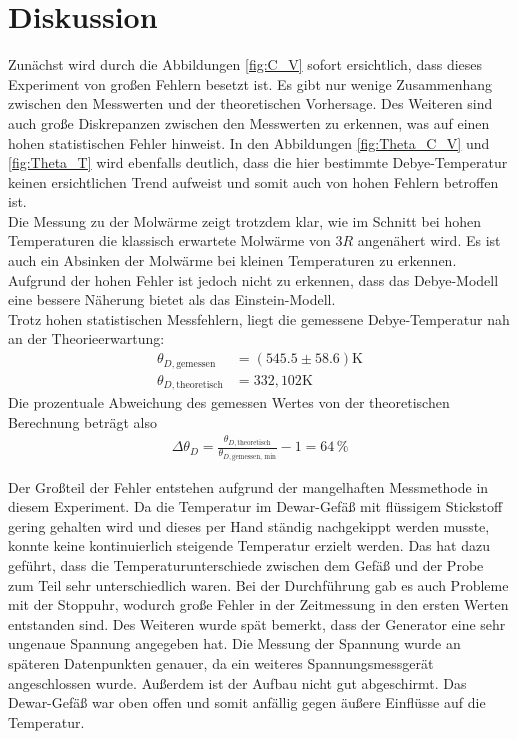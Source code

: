 \section{Diskussion}
\label{sec:Diskussion}
Zunächst wird durch die Abbildungen \ref{fig:C_V} sofort ersichtlich, dass dieses Experiment von großen Fehlern besetzt ist. 
Es gibt nur wenige Zusammenhang zwischen den Messwerten und der theoretischen Vorhersage. Des Weiteren sind 
auch große Diskrepanzen zwischen den Messwerten zu erkennen, was auf einen hohen statistischen Fehler hinweist. In den Abbildungen 
\ref{fig:Theta_C_V} und \ref{fig:Theta_T} wird ebenfalls deutlich, dass die hier bestimmte Debye-Temperatur keinen ersichtlichen Trend aufweist 
und somit auch von hohen Fehlern betroffen ist. \\
Die Messung zu der Molwärme zeigt trotzdem klar, wie im Schnitt bei hohen Temperaturen die klassisch erwartete Molwärme von $3 R$ angenähert wird. 
Es ist auch ein Absinken der Molwärme bei kleinen Temperaturen zu erkennen. Aufgrund der hohen Fehler ist jedoch nicht zu erkennen, dass das Debye-Modell eine bessere Näherung 
bietet als das Einstein-Modell.  \\

Trotz hohen statistischen Messfehlern, liegt die gemessene Debye-Temperatur nah an der Theorieerwartung:
\begin{align*}
    \theta_{D,\text{gemessen}} &= (545.5 \pm 58.6) \si{\kelvin}\\
    \theta_{D,\text{theoretisch}} &= 332,102 \si{\kelvin}
\end{align*}
Die prozentuale Abweichung des gemessen Wertes von der theoretischen Berechnung beträgt also
\begin{align*}
    \Delta \theta_D =\frac{\theta_{D,\text{theoretisch}}}{\theta_{D,\text{gemessen, min}}} -1 =  64 \,\si{\%}
\end{align*}

Der Großteil der Fehler entstehen aufgrund der mangelhaften Messmethode in diesem Experiment. Da die Temperatur im Dewar-Gefäß mit flüssigem Stickstoff 
gering gehalten wird und dieses per Hand ständig nachgekippt werden musste, konnte keine kontinuierlich steigende Temperatur erzielt werden. 
Das hat dazu geführt, dass die Temperaturunterschiede zwischen dem Gefäß und der Probe zum Teil sehr unterschiedlich waren. 
Bei der Durchführung gab es auch Probleme mit der Stoppuhr, wodurch große Fehler in der Zeitmessung in den ersten Werten entstanden sind. Des Weiteren wurde spät bemerkt, dass der Generator eine sehr ungenaue Spannung angegeben hat. Die Messung der Spannung wurde an späteren Datenpunkten genauer, da ein weiteres Spannungsmessgerät angeschlossen wurde.   
Außerdem ist der Aufbau nicht gut abgeschirmt. Das Dewar-Gefäß war oben offen und somit anfällig gegen äußere Einflüsse auf die Temperatur. 
